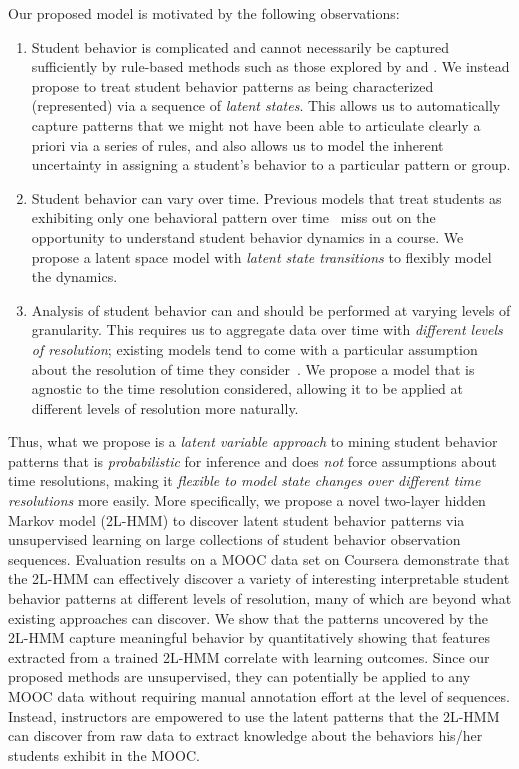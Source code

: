 Our proposed model is motivated by the following observations:
\begin{enumerate}
  \item Student behavior is complicated and cannot necessarily be captured
      sufficiently by rule-based methods such as those explored by
      \citet{Kizilcec:2013:LAK} and \citet{Davis:2016:EDM}. We instead
      propose to treat student behavior patterns as being characterized
      (represented) via a sequence of \emph{latent states}. This allows us
      to automatically capture patterns that we might not have been able to
      articulate clearly a priori via a series of rules, and also allows us
      to model the inherent uncertainty in assigning a student's behavior
      to a particular pattern or group.
  \item Student behavior can vary over time. Previous models that treat students
      as exhibiting only one behavioral pattern over
      time~\cite{Faucon:2016:EDM} miss out on the opportunity to understand
      student behavior dynamics in a course. We propose a latent space
      model with {\em latent state transitions} to flexibly model the
      dynamics.
  \item Analysis of student behavior can and should be performed at varying
      levels of granularity. This requires us to aggregate data over time
      with \emph{different levels of resolution}; existing models tend to come
      with a particular assumption about the resolution of time they
      consider~\cite{Faucon:2016:EDM, Kizilcec:2013:LAK, Shih:2010:EDM}. We
      propose a model that is agnostic to the time resolution considered,
      allowing it to be applied at different levels of resolution more
      naturally.
\end{enumerate}

Thus, what we propose is a \emph{latent variable approach} to mining student behavior
patterns that is \emph{probabilistic} for inference and 
does \emph{not} force assumptions about time resolutions, making it
\emph{flexible to model state changes over different time resolutions} more
easily.  More specifically, we propose a novel two-layer hidden Markov
model (2L-HMM) to discover latent student behavior patterns via
unsupervised learning on large collections of student behavior observation
sequences.  Evaluation results on a MOOC data set on Coursera demonstrate
that the 2L-HMM can effectively discover a variety of interesting interpretable
student behavior patterns at different levels of resolution, many of which
are beyond what existing approaches can discover. We show that the patterns
uncovered by the 2L-HMM capture meaningful behavior by quantitatively
showing that features extracted from a trained 2L-HMM correlate with
learning outcomes. Since our proposed methods are
unsupervised, they can potentially be applied to any MOOC data without
requiring manual annotation effort at the level of sequences. Instead,
instructors are empowered to use the latent patterns that the 2L-HMM can
discover from raw data to extract knowledge about the behaviors his/her
students exhibit in the MOOC.
